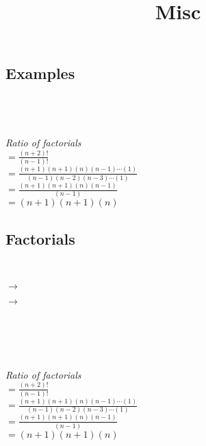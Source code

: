 \documentclass{article}
\begin{document}
    \subsection{Examples}

        \begingroup
        \centering

        \\

        \hrulefill \\[10pt]

        \\[5pt]
        \textit{Ratio of factorials}\\[15pt]

        $=\frac{(n+2)!}{(n-1)!}$\\[15pt]
        
        $= \frac{(n+1)(n+1)(n)(n-1)\cdots(1)}{(n-1)(n-2)(n-3)\cdots(1)}$\\[15pt]
        
        $= \frac{(n+1)(n+1)(n)(n-1)}{(n-1)}$\\[15pt]

        $= {(n+1)(n+1)(n)}$\\[15pt]

        \endgroup
    \pagebreak



\title{Misc}
    \centering
    \subsection{\huge Factorials}

        \hrulefill \\[10pt]


            $\rightarrow$


            $\rightarrow$


            \hrulefill \\[10pt]

    \\

    \hrulefill \\[10pt]

    \\[5pt]
    \textit{Ratio of factorials}\\[15pt]

    $=\frac{(n+2)!}{(n-1)!}$\\[15pt]
    
    $= \frac{(n+1)(n+1)(n)(n-1)\cdots(1)}{(n-1)(n-2)(n-3)\cdots(1)}$\\[15pt]
    
    $= \frac{(n+1)(n+1)(n)(n-1)}{(n-1)}$\\[15pt]

    $= {(n+1)(n+1)(n)}$\\[15pt]
\end{document}
